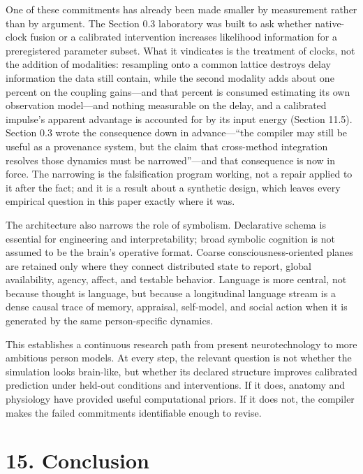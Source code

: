 One of these commitments has already been made smaller by measurement rather
than by argument. The Section 0.3 laboratory was built to ask whether
native-clock fusion or a calibrated intervention increases likelihood
information for a preregistered parameter subset. What it vindicates is the
treatment of clocks, not the addition of modalities: resampling onto a common
lattice destroys delay information the data still contain, while the second
modality adds about one percent on the coupling gains---and that percent is
consumed estimating its own observation model---and nothing measurable on the
delay, and a calibrated impulse's apparent advantage is accounted for by its
input energy (Section 11.5). Section 0.3 wrote the consequence down in
advance---``the
compiler may still be useful as a provenance system, but the claim that
cross-method integration resolves those dynamics must be narrowed''---and that
consequence is now in force. The narrowing is the falsification program working,
not a repair applied to it after the fact; and it is a result about a synthetic
design, which leaves every empirical question in this paper exactly where it
was.

The architecture also narrows the role of symbolism. Declarative schema is
essential for engineering and interpretability; broad symbolic cognition is
not assumed to be the brain's operative format. Coarse consciousness-oriented
planes are retained only where they connect distributed state to report,
global availability, agency, affect, and testable behavior. Language is more
central, not because thought is language, but because a longitudinal language
stream is a dense causal trace of memory, appraisal, self-model, and social
action when it is generated by the same person-specific dynamics.

This establishes a continuous research path from present neurotechnology to
more ambitious person models. At every step, the relevant question is not
whether the simulation looks brain-like, but whether its declared structure
improves calibrated prediction under held-out conditions and interventions.
If it does, anatomy and physiology have provided useful computational priors.
If it does not, the compiler makes the failed commitments identifiable enough
to revise.

\section{15. Conclusion}

